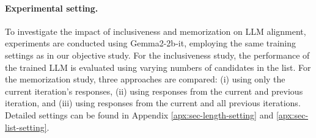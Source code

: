 \paragraph{Experimental setting.}
To investigate the impact of inclusiveness and memorization on LLM alignment, experiments are conducted using Gemma2-2b-it, employing the same training settings as in our objective study. 
For the inclusiveness study, the performance of the trained LLM is evaluated using varying numbers of candidates in the list.
For the memorization study, three approaches are compared: (i) using only the current iteration's responses, (ii) using responses from the current and previous iteration, and (iii) using responses from the current and all previous iterations. 
Detailed settings can be found in Appendix \ref{apx:sec-length-setting} and \ref{apx:sec-list-setting}.




\begin{table}[t]
    \centering
    \caption{Candidate list study with $\mathcal{L}_{\text{pair}}$ on Gemma2-2b-it. Previous iteration responses enhance performance.}\label{fig:list-study}
    \small
\end{table}



